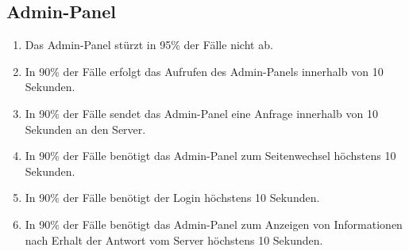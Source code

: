 \subsection{Admin-Panel}

\begin{enumerate}
    \item Das Admin-Panel stürzt in 95\% der Fälle nicht ab.
    \item In 90\% der Fälle erfolgt das Aufrufen des Admin-Panels innerhalb von 10 Sekunden.
    \item In 90\% der Fälle sendet das Admin-Panel eine Anfrage innerhalb von 10 Sekunden an den Server.
    \item In 90\% der Fälle benötigt das Admin-Panel zum Seitenwechsel höchstens 10 Sekunden.
    \item In 90\% der Fälle benötigt der Login höchstens 10 Sekunden.
    \item In 90\% der Fälle benötigt das Admin-Panel zum Anzeigen von Informationen nach Erhalt der Antwort vom Server höchstens 10 Sekunden.
\end{enumerate}